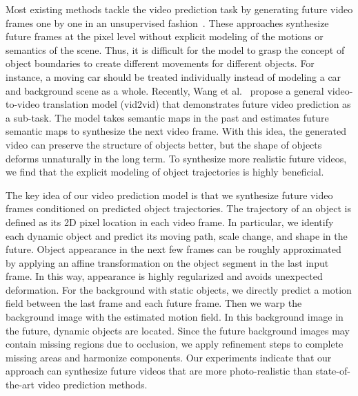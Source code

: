 \documentclass[10pt,twocolumn,letterpaper]{article}
\begin{document}
Most existing methods tackle the video prediction task by generating future video frames one by one in an unsupervised fashion~\cite{prednet,xue2016visual,Villegas2017,DentonFergus2018}. These approaches synthesize future frames at the pixel level without explicit modeling of the motions or semantics of the scene. Thus, it is difficult for the model to grasp the concept of object boundaries to create different movements for different objects. 
For instance, a moving car should be treated individually instead of modeling a car and background scene as a whole. Recently, Wang et al.~\cite{Wang2018} propose a general video-to-video translation model (vid2vid) that demonstrates future video prediction as a sub-task. The model takes semantic maps in the past and estimates future semantic maps to synthesize the next video frame. With this idea, the generated video can preserve the structure of objects better, but the shape of objects deforms unnaturally in the long term. To synthesize more realistic future videos, we find that the explicit modeling of object trajectories is highly beneficial.


The key idea of our video prediction model is that we synthesize future video frames conditioned on predicted object trajectories. The trajectory of an object is defined as its 2D pixel location in each video frame. In particular, we identify each dynamic object and predict its moving path, scale change, and shape in the future. Object appearance in the next few frames can be roughly approximated by applying an affine transformation on the object segment in the last input frame. In this way, appearance is highly regularized and avoids unexpected deformation. For the background with static objects, we directly predict a motion field between the last frame and each future frame. Then we warp the background image with the estimated motion field. In this background image in the future, dynamic objects are located. Since the future background images may contain missing regions due to occlusion, we apply refinement steps to complete missing areas and harmonize components. Our experiments indicate that our approach can synthesize future videos that are more photo-realistic than state-of-the-art video prediction methods. 
\end{document}
